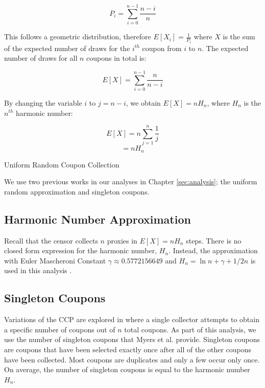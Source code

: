 $$P_i = \sum_{i=0}^{n-1}\frac{n-i}{n}$$

This follows a geometric distribution, therefore $E[X_i]=\frac{1}{P_i}$ where $X$ is the sum of the expected number of draws for the $i^{th}$ coupon from $i$ to $n$.
The expected number of draws for all $n$ coupons in total is:

$$E[X] = \sum_{i=0}^{n-1}\frac{n}{n-i}$$

By changing the variable $i$ to $j=n-i$, we obtain $E[X] = nH_n$, where $H_n$ is the $n^{th}$ harmonic number:

$$E[X] = n \sum_{j=1}^{n}\frac{1}{j}$$
$$= nH_n$$

\begin{algorithm}[t]
\DontPrintSemicolon
{}
\caption{Uniform Random Coupon Collection \label{uni}}
\end{algorithm}

We use two previous works in our analyses in Chapter \ref{sec:analysis}; the uniform random approximation and singleton coupons.

\subsection{Harmonic Number Approximation} 

Recall that the censor collects $n$ proxies in $E[X]= nH_n$ steps. There is no closed form expression for the harmonic number, $H_n$. Instead, the approximation with Euler Mascheroni Constant $\gamma \approx 0.5772156649$ and $H_n = \ln{n} + \gamma + 1/2n$ is used in this analysis \cite{flajolet1992birthday}.

\subsection{Singleton Coupons} 

Variations of the \ac{CCP} are explored in \cite{myers2006some} where a single collector attempts to obtain a specific number of coupons out of $n$ total coupons. As part of this analysis, we use the number of singleton coupons that Myers et al. provide. Singleton coupons are coupons that have been selected exactly once after all of the other coupons have been collected. Most coupons are duplicates and only a few occur only once. On average, the number of singleton coupons is equal to the harmonic number $H_n$.

